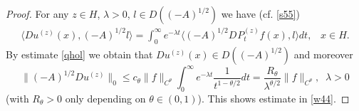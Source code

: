 \documentclass[preprint]{imsart}
\begin{document}
\begin{proof}
For any $z \in H$, $\lambda >0$, $l \in D((-A)^{1/2}) $  we have (cf. \eqref{s55})
\begin{gather*}
  \langle D u^{(z)}(x), (-A)^{1/2} l\rangle =  \int_0^{\infty} e^{- \lambda t} \langle   (-A)^{1/2} D_{} P_t^{(z)} f(x),  l \rangle dt,\;\;\; x\in H . 
\end{gather*}
 By estimate \eqref{qhol} we obtain  that $D u^{(z)}(x) \in D((-A)^{1/2})$ and moreover 
 \begin{equation}\label{qcv}
 \| (-A)^{1/2} Du^{(z)} \|_0  \le  c_{\theta}\|f\|_{C^{\theta}}  \int_0^{\infty} e^{- \lambda t} \frac{1} {t^{1- \theta/2} }    dt =   \frac{R_{\theta}}{\lambda^{\theta/2}}\|f\|_{C^{\theta}},\;\; \lambda>0
\end{equation}
 (with $R_{\theta} >0$ only depending on $\theta \in (0,1)$).   This shows  estimate in \eqref{w44}.  
 

 
   

\end{proof}
\end{document}
